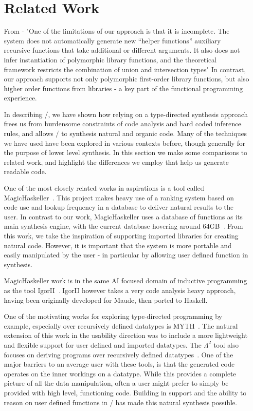 \section{Related Work}
\label{sec:related}

From \cite{Osera:2016} -
  "One of the limitations of our approach is that it is incomplete.
  The system does not automatically generate new “helper functions” auxiliary recursive functions that take additional or different arguments.
  It also does not infer instantiation of polymorphic library functions, and the theoretical framework restricts the combination of union and intersection types"
In contrast, our approach supports not only polymorphic first-order library functions, but also higher order functions from libraries - a key part of the functional programming experience. 

In describing \ourTool/, we have shown how relying on a type-directed synthesis approach frees us from burdensome constraints of code analysis and hard coded inference rules, and allows \ourTool/ to synthesis natural and organic code. Many of the techniques we have used have been explored in various contexts before, though generally for the purpose of lower level synthesis. In this section we make some comparisons to related work, and highlight the differences we employ that help us generate readable code.

One of the most closely related works in aspirations is a tool called MagicHaskeller~\cite{DBLP:conf/aaip/Katayama09}. This project makes heavy use of a ranking system based on code use and lookup frequency in a database to deliver natural results to the user. In contrast to our work, MagicHaskeller uses a database of functions as its main synthesis engine, with the current database hovering around
64GB~\cite{DBLP:conf/agi/Katayama15}. From this work, we take the inspiration of supporting imported libraries for creating natural code. However, it is important that the system is more portable and easily manipulated by the user - in particular by allowing user defined function in synthesis.

MagicHaskeller work is in the same AI focused domain of inductive programming as the tool IgorII~\cite{DBLP:conf/aaip/HofmannKS09}. IgorII however takes a very code analysis heavy approach, having been originally developed for Maude, then ported to Haskell.

One of the motivating works for exploring type-directed programming by example, especially over recursively defined datatypes is MYTH~\cite{Osera:2015, Osera:2016}. The natural extension of this work in the usability direction was to include a more lightweight and flexible support for user defined and imported datatypes. The $\Lambda^2$ tool also focuses on deriving programs over recursively defined datatypes~\cite{Feser:2015}. One of the major barriers to an average user with these tools, is that the generated code operates on the inner workings on a datatype. While this provides a complete picture of all the data manipulation, often a user might prefer to simply be provided with high level, functioning code. Building in support and the ability to reason on user defined functions in \ourTool/ has made this natural synthesis possible.

